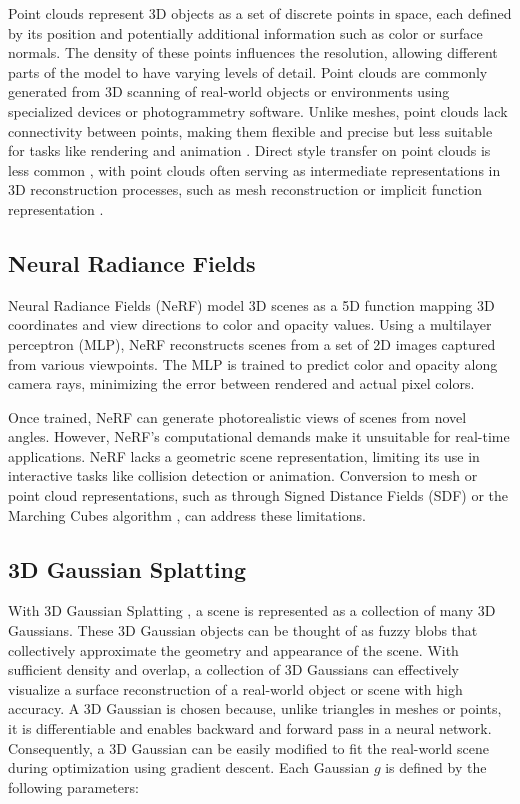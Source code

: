 Point clouds represent 3D objects as a set of discrete points in space, each defined by its position and potentially additional information such as color or surface normals. The density of these points influences the resolution, allowing different parts of the model to have varying levels of detail. Point clouds are commonly generated from 3D scanning of real-world objects or environments using specialized devices or photogrammetry software. Unlike meshes, point clouds lack connectivity between points, making them flexible and precise but less suitable for tasks like rendering and animation \citep{Bassier.2020}.
Direct style transfer on point clouds is less common \citep{Cao.2020}, with point clouds often serving as intermediate representations in 3D reconstruction processes, such as mesh reconstruction or implicit function representation \citep{Mildenhall.2020, Kerbl.2023, Mu.2021}.

\subsection{Neural Radiance Fields}
Neural Radiance Fields (NeRF) \citep{Mildenhall.2020} model 3D scenes as a 5D function mapping 3D coordinates and view directions to color and opacity values. Using a multilayer perceptron (MLP), NeRF reconstructs scenes from a set of 2D images captured from various viewpoints. The MLP is trained to predict color and opacity along camera rays, minimizing the error between rendered and actual pixel colors.

Once trained, NeRF can generate photorealistic views of scenes from novel angles. However, NeRF's computational demands make it unsuitable for real-time applications. NeRF lacks a geometric scene representation, limiting its use in interactive tasks like collision detection or animation. Conversion to mesh or point cloud representations, such as through Signed Distance Fields (SDF) \citep{Darmon.2021} or the Marching Cubes algorithm \citep{Lorensen.1987}, can address these limitations.


\subsection{3D Gaussian Splatting}

With 3D Gaussian Splatting , a scene is represented as a collection of many 3D Gaussians. These 3D Gaussian objects can be thought of as fuzzy blobs that collectively approximate the geometry and appearance of the scene. With sufficient density and overlap, a collection of 3D Gaussians can effectively visualize a surface reconstruction of a real-world object or scene with high accuracy. A 3D Gaussian is chosen because, unlike triangles in meshes or points, it is differentiable and enables backward and forward pass in a neural network. Consequently, a 3D Gaussian can be easily modified to fit the real-world scene during optimization using gradient descent. Each Gaussian $g$ is defined by the following parameters:

